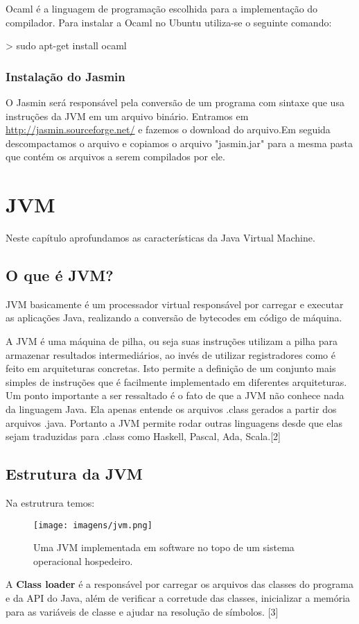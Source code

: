 \documentclass[12pt,a4paper,twoside]{report}
\begin{document}
           Ocaml é a linguagem de programação escolhida para a implementação do compilador. Para instalar a Ocaml no Ubuntu utiliza-se o seguinte comando:

         \begin{terminal}
         > sudo apt-get install ocaml
         \end{terminal}

\subsection{Instalação do Jasmin}
O Jasmin será responsável pela conversão de um programa com sintaxe que usa instruções da JVM em um arquivo binário.
Entramos em \url{http://jasmin.sourceforge.net/} e fazemos o download do arquivo.Em seguida descompactamos o arquivo e copiamos o arquivo "jasmin.jar" para a mesma pasta que contém os arquivos a serem compilados por ele.



\chapter{JVM}
Neste capítulo aprofundamos as características da Java Virtual Machine.
\section{O que é JVM?}
JVM basicamente é um processador virtual responsável por carregar e executar as aplicações Java, realizando a conversão de bytecodes em código de máquina. 

A JVM é uma máquina de pilha, ou seja suas instruções utilizam a
pilha para armazenar resultados intermediários, ao invés de utilizar registradores como é feito em
arquiteturas concretas. Isto permite a definição de um conjunto mais simples de instruções que é
facilmente implementado em diferentes arquiteturas.
Um ponto importante a ser ressaltado é o fato de que a JVM não conhece nada da
linguagem Java. Ela apenas entende  os arquivos .class gerados a partir dos arquivos .java. Portanto
a JVM permite rodar outras linguagens desde que elas sejam traduzidas para .class como Haskell, Pascal, Ada, Scala.[2]
\section{Estrutura da JVM}
Na estrutrura temos:


\begin{figure}[!ht]
\centering
\caption{Uma JVM implementada em software no topo de um sistema operacional
hospedeiro.
      \label{fig:2}}
\texttt{[image: imagens/jvm.png]}
\end{figure}
 A \textbf{ Class loader} é a responsável por carregar os arquivos das classes do programa e da API
do Java, além de verificar a corretude das classes, inicializar a memória para as
variáveis de classe e ajudar na resolução de símbolos. [3]
\end{document}
